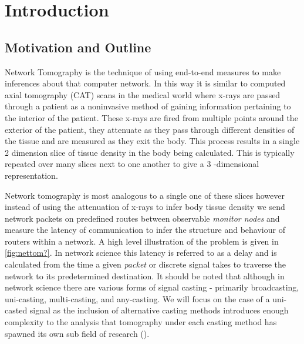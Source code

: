 \chapter{Introduction}
\label{cha:intro}


\newpage
\section{Motivation and Outline}
\label{sec:Imotivationandoutline}

Network Tomography is the technique of using end-to-end measures to make inferences about that computer network. In this way it is similar to computed axial tomography (CAT) scans in the medical world where x-rays are passed through a patient as a noninvasive method of gaining information pertaining to the interior of the patient. These x-rays are fired from multiple points around the exterior of the patient, they attenuate as they pass through different densities of the tissue and are measured as they exit the body. This process results in a single 2 dimension slice of tissue density in the body being calculated. This is typically repeated over many slices next to one another to give a 3 -dimensional representation.\par
Network tomography is most analogous to a single one of these slices however instead of using the attenuation of x-rays to infer body tissue density we send network packets on predefined routes between observable \textit{monitor nodes} and measure the latency of communication to infer the structure and behaviour of routers within a network. A high level illustration of the problem is given in \ref{fig:nettom?}. In network science this latency is referred to as a delay and is calculated from the time a given \textit{packet} or discrete signal takes to traverse the network to its predetermined destination. It should be noted that although in network science there are various forms of signal casting - primarily broadcasting, uni-casting, multi-casting, and any-casting. We will focus on the case of a uni-casted signal as the inclusion of alternative casting methods introduces enough complexity to the analysis that tomography under each casting method has spawned its own sub field of research (\cite{lawrence_network_2006}).\par
